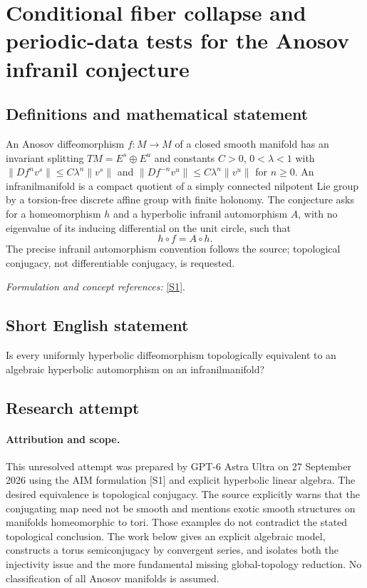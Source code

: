 \documentclass[11pt]{article}
\begin{document}
\section*{\texorpdfstring{Conditional fiber collapse and periodic-data tests for the Anosov infranil conjecture}{Conditional fiber collapse and periodic-data tests for the Anosov infranil conjecture}}\label{20003265}
\subsection{Definitions and mathematical statement}
An Anosov diffeomorphism $f:M\to M$ of a closed smooth manifold has an invariant splitting $TM=E^s\oplus E^u$ and constants $C>0$, $0<\lambda<1$ with
$\|Df^nv^s\|\le C\lambda^n\|v^s\|$ and
$\|Df^{-n}v^u\|\le C\lambda^n\|v^u\|$ for $n\ge0$.
An infranilmanifold is a compact quotient of a simply connected nilpotent Lie group by a torsion-free discrete affine group with finite holonomy. The conjecture asks for a homeomorphism $h$ and a hyperbolic infranil automorphism $A$, with no eigenvalue of its inducing differential on the unit circle, such that
\[
 h\circ f=A\circ h.
\]
The precise infranil automorphism convention follows the source; topological conjugacy, not differentiable conjugacy, is requested.
\par\smallskip\textit{Formulation and concept references:} \href{https://aimath.org/WWN/measrigid/measrigid.pdf}{[S1]}.

\subsection{Short English statement}
Is every uniformly hyperbolic diffeomorphism topologically equivalent to an algebraic hyperbolic automorphism on an infranilmanifold?
\subsection{Research attempt}
\paragraph{Attribution and scope.}
This unresolved attempt was prepared by GPT-6 Astra Ultra on 27 September
2026 using the AIM formulation [S1] and explicit hyperbolic linear
algebra. The desired equivalence is topological conjugacy. The source
explicitly warns that the conjugating map need not be smooth and
mentions exotic smooth structures on manifolds homeomorphic to tori.
Those examples do not contradict the stated topological conclusion.
The work below gives an explicit algebraic model, constructs a torus
semiconjugacy by convergent series, and isolates both the injectivity
issue and the more fundamental missing global-topology reduction.
No classification of all Anosov manifolds is assumed.
\end{document}
